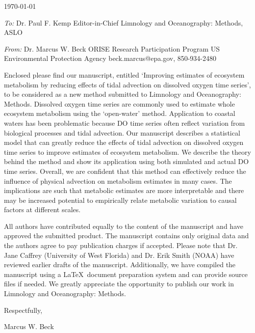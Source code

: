 \documentclass[a4paper,12pt]{article}
\begin{document}
\renewcommand{\rmdefault}{ptm}
\pagestyle{empty} 

\setlength{\parindent}{0mm} 
\setlength{\parskip}{5mm}

\begin{flushright}
\today
\end{flushright}

\emph{To:}\newline
Dr. Paul F. Kemp\newline
Editor-in-Chief\newline
Limnology and Oceanography: Methods, ASLO

\emph{From:}\newline
Dr. Marcus W. Beck\newline
ORISE Research Participation Program\newline
US Environmental Protection Agency\newline
beck.marcus@epa.gov, 850-934-2480\vspace{14.5pt}

Enclosed please find our manuscript, entitled `Improving estimates of ecosystem metabolism by reducing effects of tidal advection on dissolved oxygen time series', to be considered as a new method submitted to Limnology and Oceanography: Methods.  Dissolved oxygen time series are commonly used to estimate whole ecosystem metabolism using the `open-water' method.  Application to coastal waters has been problematic because DO time series often reflect variation from biological processes and tidal advection.  Our manuscript describes a statistical model that can greatly reduce the effects of tidal advection on dissolved oxygen time series to improve estimates of ecosystem metabolism.  We describe the theory behind the method and show its application using both simulated and actual DO time series.  Overall, we are confident that this method can effectively reduce the influence of physical advection on metabolism estimates in many cases.  The implications are such that metabolic estimates are more interpretable and there may be increased potential to empirically relate metabolic variation to causal factors at different scales.

All authors have contributed equally to the content of the manuscript and have approved the submitted product.  The manuscript contains only original data and the authors agree to pay publication charges if accepted.  Please note that Dr. Jane Caffrey (University of West Florida) and Dr. Erik Smith (NOAA) have reviewed earlier drafts of the manuscript.  Additionally, we have compiled the manuscript using a \LaTeX\ document preparation system and can provide source files if needed.  We greatly appreciate the opportunity to publish our work in Limnology and Oceanography: Methods.\vspace{0.5in}

\hspace{4.5in}Respectfully,

\hspace{4.5in}Marcus W. Beck
\end{document}
